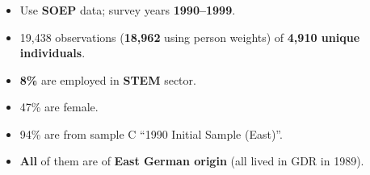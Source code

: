 \documentclass[11pt, aspectratio=1610, xcolor={dvipsnames}]{beamer}
\newcommand{\highlight}[1]{\textbf{\textcolor{PineGreen}{#1}}}
\begin{document}
	\begin{frame}
		\frametitle{}
		
		\begin{itemize}
			\item Use \highlight{SOEP} data; survey years \highlight{1990--1999}.
			\item 19,438 observations (\highlight{18,962} using person weights) of \highlight{4,910 unique individuals}.
			\item \highlight{8\%} are employed in \highlight{STEM} sector.
			\item 47\% are female.
			\item 94\% are from sample C ``1990 Initial Sample (East)''.
			\item \highlight{All} of them are of \highlight{East German origin} (all lived in GDR in 1989).
		\end{itemize}
		
	\end{frame}
		
\end{document}
